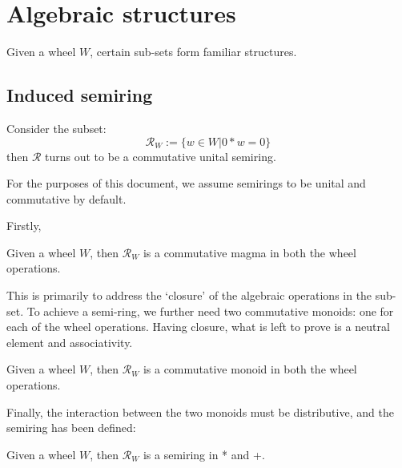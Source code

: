 \section{Algebraic structures} 
Given a wheel $W$, certain sub-sets form familiar structures. 
\subsection{Induced semiring}
Consider the subset:
\[
\mathcal{R}_{W} := \{ w \in W | 0*w = 0 \}
\]
then $\mathcal{R}$ turns out to be a commutative unital semiring.
\begin{remark}
 For the purposes of this document, we assume semirings to be unital and commutative by default.
\end{remark}
Firstly,
\begin{definition}
  \label{def:R_w_magma}
  \leanok
  Given a wheel $W$, then $\mathcal{R}_{W}$ is a commutative magma in both the wheel operations.
\end{definition}
This is primarily to address the `closure' of the algebraic operations in the sub-set. To achieve a semi-ring,
we further need two commutative monoids: one for each of the wheel operations. Having closure, what is left to prove is
a neutral element and associativity.
\begin{definition}
  \label{def:R_w_monoid}
  \leanok
  Given a wheel $W$, then $\mathcal{R}_{W}$ is a commutative monoid in both the wheel operations.
\end{definition}
Finally, the interaction between the two monoids must be distributive, and the semiring has been defined:
\begin{definition}
  \label{def:R_w_semiring}
  Given a wheel $W$, then $\mathcal{R}_{W}$ is a semiring in * and +.
\end{definition}
